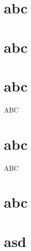\documentclass{iitthesis}
\begin{document}

\section{abc}

\section{abc}




\section{abc}

ABC

\section{abc}

ABC

\section{abc}








\appendix
{}



\section{asd}
\end{document}
